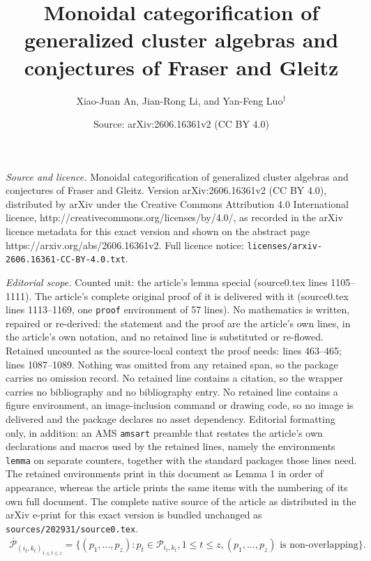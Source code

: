 \documentclass[10pt,a4paper]{amsart}
\title{Monoidal categorification of generalized cluster algebras and conjectures of Fraser and Gleitz}
\author{Xiao-Juan An, Jian-Rong Li, and Yan-Feng Luo$^\dag$}
\date{Source: arXiv:2606.16361v2 (CC BY 4.0)}
\begin{document}
\maketitle

\noindent\emph{Source and licence.} Monoidal categorification of generalized cluster algebras and conjectures of Fraser and Gleitz. Version arXiv:2606.16361v2 (CC BY 4.0), distributed by arXiv under the Creative Commons Attribution 4.0 International licence, http://creativecommons.org/licenses/by/4.0/, as recorded in the arXiv licence metadata for this exact version and shown on the abstract page https://arxiv.org/abs/2606.16361v2. Full licence notice: \texttt{licenses/arxiv-2606.16361-CC-BY-4.0.txt}.\par\smallskip

\noindent\textit{Editorial scope.} Counted unit: the article's lemma special (source0.tex lines 1105--1111). The article's complete original proof of it is delivered with it (source0.tex lines 1113--1169, one \texttt{proof} environment of 57 lines). No mathematics is written, repaired or re-derived: the statement and the proof are the article's own lines, in the article's own notation, and no retained line is substituted or re-flowed.  Retained uncounted as the source-local context the proof needs: lines 463--465; lines 1087--1089.  Nothing was omitted from any retained span, so the package carries no omission record.  No retained line contains a citation, so the wrapper carries no bibliography and no bibliography entry.  No retained line contains a figure environment, an image-inclusion command or drawing code, so no image is delivered and the package declares no asset dependency.  Editorial formatting only, in addition: an AMS \texttt{amsart} preamble that restates the article's own declarations and macros used by the retained lines, namely the environments \texttt{lemma} on separate counters, together with the standard packages those lines need.  The retained environments print in this document as Lemma 1 in order of appearance, whereas the article prints the same items with the numbering of its own full document.  The complete native source of the article as distributed in the arXiv e-print for this exact version is bundled unchanged as \texttt{sources/202931/source0.tex}.
\begin{align}\label{Non-overlapping paths}
\overline{\mathscr{P}}_{(i_{t},k_{t})_{1\leq t\leq z}}=\{(p_{1},\ldots,p_{z}): p_{t}\in \mathscr{P}_{i_{t},k_{t}}, 1\leq t\leq z, (p_{1},\ldots,p_{z})\text{ is } \text {non-overlapping}\}.
\end{align}
\end{document}
